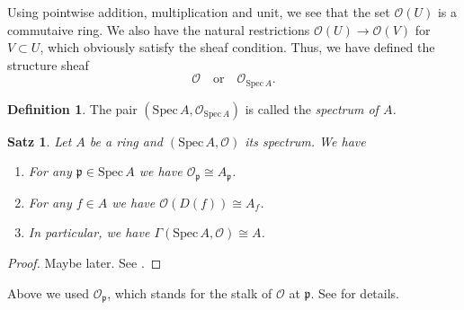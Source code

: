 \documentclass[reqno,12pt]{article}
\numberwithin{equation}{section}
\newcommand{\cO}{\mathcal{O}}
\newcommand{\Spec}{\text{Spec}\,}
\theoremstyle{plain}
\newtheorem{proposition}[thm]{Satz}
\theoremstyle{definition}
\newtheorem{definition}[thm]{Definition}
\newcommand{\fp}{\mathfrak{p}}
\begin{document}
Using pointwise addition, multiplication and unit, we see that the set $\cO(U)$
is a commutaive ring. We also have the natural restrictions $\cO(U) \to \cO(V)$
for $V \subset U$, which obviously satisfy the sheaf condition. Thus, we have
defined the structure sheaf
\begin{equation*}
  \cO \quad \text{or} \quad \cO_{\Spec A}.
\end{equation*}


\begin{definition}
  The pair $(\Spec A, \cO_{\Spec A})$ is called the \emph{spectrum of $A$.}
\end{definition}


\begin{proposition}\label{proposition:spec-A-structure-sheaf}
  Let $A$ be a ring and $(\Spec A, \cO)$ its spectrum. We have
  \begin{enumerate}
    \item For any $\fp \in \Spec A$ we have $\cO_{\fp} \cong A_{\fp}$.

    \item For any $f \in A$ we have $\cO(D(f)) \cong A_f$.

    \item In particular, we have $\Gamma(\Spec A, \cO) \cong A$.
  \end{enumerate}
\end{proposition}

\begin{proof}
  Maybe later. See \cite[Chapter II, Proposition 2.2]{Ha}.
\end{proof}

Above we used $\cO_{\fp}$, which stands for the stalk of $\cO$ at $\fp$.
See \cite[p.~62]{Ha} for details.


\newpage


\end{document}
